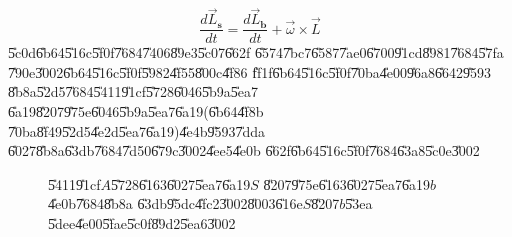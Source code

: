 \documentclass[12pt,a4paper]{article}
\begin{document}
\begin{equation}
\frac{d\vec{L}_{\boldsymbol{s}}}{dt}=\frac{d\vec{L}_{\boldsymbol{b}}}{dt}+%
\vec{\omega}\times \vec{L}  \label{eq1}
\end{equation}%
\U{5c0d}\U{6b64}\U{516c}\U{5f0f}\U{7684}\U{7406}\U{89e3}\U{5c07}\U{662f}%
\U{6574}\U{7bc7}\U{6587}\U{7ae0}\U{6700}\U{91cd}\U{8981}\U{7684}\U{57fa}%
\U{790e}\U{3002}\U{6b64}\U{516c}\U{5f0f}\U{5982}\U{4f55}\U{800c}\U{4f86}%
\U{ff1f}\U{6b64}\U{516c}\U{5f0f}\U{70ba}\U{4e00}\U{96a8}\U{6642}\U{9593}%
\U{8b8a}\U{52d5}\U{7684}\U{5411}\U{91cf}\U{5728}\U{6046}\U{5b9a}\U{5ea7}%
\U{6a19}\U{8207}\U{975e}\U{6046}\U{5b9a}\U{5ea7}\U{6a19}(\U{6b64}\U{4f8b}%
\U{70ba}\U{8f49}\U{52d5}\U{4e2d}\U{5ea7}\U{6a19})\U{4e4b}\U{9593}\U{7dda}%
\U{6027}\U{8b8a}\U{63db}\U{7684}\U{7d50}\U{679c}\U{3002}\U{4ee5}\U{4e0b}%
\U{662f}\U{6b64}\U{516c}\U{5f0f}\U{7684}\U{63a8}\U{5c0e}\U{3002}

\begin{figure}[th]
\caption{{}\U{5411}\U{91cf}$A$\U{5728}\U{6163}\U{6027}\U{5ea7}\U{6a19}$S$%
\U{8207}\U{975e}\U{6163}\U{6027}\U{5ea7}\U{6a19}$b$\U{4e0b}\U{7684}\U{8b8a}%
\U{63db}\U{95dc}\U{4fc2}\U{3002}\U{8003}\U{616e}$S$\U{8207}$b$\U{53ea}%
\U{5dee}\U{4e00}\U{5fae}\U{5c0f}\U{89d2}\U{5ea6}\U{3002}}
\label{firstfig}
\begin{center}
\fbox{}
\end{center}
\end{figure}
\bigskip
\end{document}
